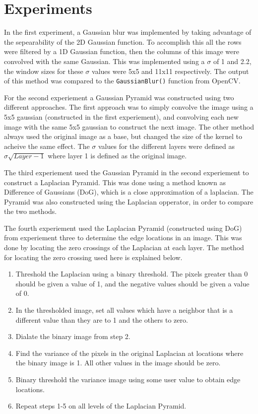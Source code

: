 \section{Experiments}

  In the first experiment, a Gaussian blur was implemented by taking advantage of the
sepearability of the 2D Gaussian function.  To accomplish this all the rows were filtered by a 
1D Gaussian function, then the columns of this image were convolved with the same Gaussian.
This was implemented using a $\sigma$ of 1 and 2.2, the window sizes for these $\sigma$ values
were 5x5 and 11x11 respectively.  The output of this method was compared to the
\texttt{GaussianBlur()} function from OpenCV.

  For the second experiement a Gaussian Pyramid was constructed using two different approaches.
The first approach was to simply convolve the image using a 5x5 gaussian (constructed in the
first experiement), and convolving each new image with the same 5x5 gaussian to construct the
next image.  The other method always used the original image as a base, but changed the size
of the kernel to acheive the same effect.  The $\sigma$ values for the different layers were
defined as $\sigma\sqrt{Layer-1}$ where layer 1 is defined as the original image.

  The third experiement used the Gaussian Pyramid in the second experiement to construct a Laplacian Pyramid.  This was done using a method known as Difference of Gaussians (DoG), which is a close approximation of a laplacian.  The Pyramid was also constructed using the Laplacian opperator, in order to compare the two methods.

  The fourth experiement used the Laplacian Pyramid (constructed using DoG) from experiement three to determine the edge locations in an image.  This was done by locating the zero crossings of the Laplacian at each layer.  The method for locating the zero crossing used here is explained below.

\begin{enumerate}
  \item Threshold the Laplacian using a binary threshold.  The pixels greater than 0 should be given a value of 1, and the negative values should be given a value of 0.
  \item In the thresholded image, set all values which have a neighbor that is a different value than they are to 1 and the others to zero.
  \item Dialate the binary image from step 2.
  \item Find the variance of the pixels in the original Laplacian at locations where the binary image is 1.  All other values in the image should be zero.
  \item Binary threshold the variance image using some user value to obtain edge locations.
  \item Repeat steps 1-5 on all levels of the Laplacian Pyramid.
\end{enumerate}

